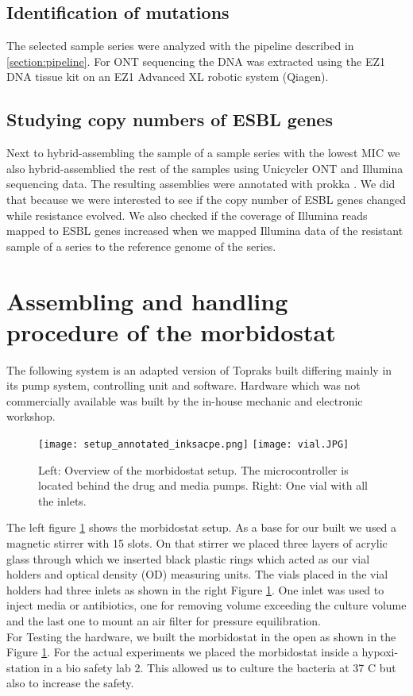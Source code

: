 \subsection{Identification of mutations}
The selected sample series were analyzed with the pipeline described in \ref{section:pipeline}. For ONT sequencing the DNA was extracted  using the EZ1 DNA tissue kit on an EZ1 Advanced XL robotic system (Qiagen).

\subsection{Studying copy numbers of ESBL genes}
Next to hybrid-assembling the sample of a sample series with the lowest MIC we also hybrid-assemblied the rest of the samples using Unicycler \cite{wick_unicycler:_2017} ONT and Illumina sequencing data. The resulting assemblies were annotated with prokka \cite{seemann_prokka:_2014}. We did that because we were interested to see if the copy number of ESBL genes changed while resistance evolved. We also checked if the coverage of Illumina reads mapped to ESBL genes increased when we mapped Illumina data of the resistant sample of a series to the reference genome of the series.

\section{Assembling and handling procedure of the morbidostat}
The following system is an adapted version of Topraks built differing mainly in its pump system, controlling unit and software. Hardware which was not commercially available was built by the in-house mechanic and electronic workshop.

\begin{figure}
	\texttt{[image: setup\_annotated\_inksacpe.png]}
	\texttt{[image: vial.JPG]}
	\caption{Left: Overview of the morbidostat setup. The microcontroller is located behind the drug and media pumps. Right: One vial with all the inlets.}
	\label{figure:morbidostat_setup}
\end{figure}  
The left figure \ref{figure:morbidostat_setup} shows the morbidostat setup.
As a base for our built we used a magnetic stirrer with 15 slots. On that stirrer we placed three layers of acrylic glass through which we inserted black plastic rings which acted as our vial holders and optical density (OD) measuring units. 
The vials placed in the vial holders had three inlets as shown in the right Figure \ref{figure:morbidostat_setup}. One inlet was used to inject media or antibiotics, one for removing volume exceeding the culture volume and the last one to mount an air filter for pressure equilibration. \\
For Testing the hardware, we built the morbidostat in the open as shown in the Figure \ref{figure:morbidostat_setup}. For the actual experiments we placed the morbidostat inside a hypoxi-station in a bio safety lab 2. This allowed us to culture the bacteria at 37 \degree C but also to increase the safety. 


